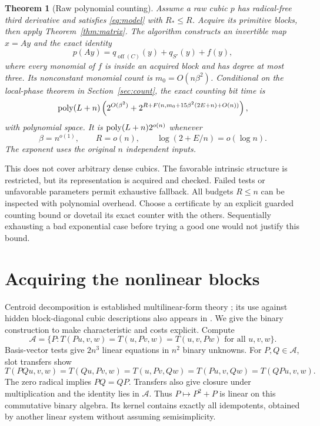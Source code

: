\documentclass[11pt,a4paper]{article}
\newtheorem{theorem}{Theorem}[section]
\newcommand{\off}{\operatorname{off}}\newcommand{\diag}{\operatorname{diag}}
\begin{document}
\begin{theorem}[Raw polynomial counting]\label{thm:raw}
Assume a raw cubic $p$ has radical-free third derivative and satisfies
\eqref{eq:model} with $R_*\le R$.
Acquire its primitive blocks, then apply Theorem~\ref{thm:matrix}.
The algorithm constructs an invertible map $x=Ay$ and the exact identity
\begin{equation}\label{eq:identity}
p(Ay)=q_{\off(C)}(y)+q_{S'}(y)+f(y),
\end{equation}
where every monomial of $f$ is inside an acquired block and has degree
at most three. Its nonconstant monomial count is $m_0=O(n\beta^2)$.
Conditional on the local-phase theorem in Section~\ref{sec:count},
the exact counting bit time is
\begin{equation}\label{eq:total}
\operatorname{poly}(L+n)\left(2^{O(\beta^2)}
+2^{R+F(n,m_0+15\beta^2(2E+n)+O(n))}\right),
\end{equation}
with polynomial space. It is $\operatorname{poly}(L+n)2^{o(n)}$ whenever
\begin{equation}\label{eq:regime}
\beta=n^{o(1)},\qquad R=o(n),\qquad
\log(2+E/n)=o(\log n).
\end{equation}
The exponent uses the original $n$ independent inputs.
\end{theorem}

This does not cover arbitrary dense cubics. The favorable intrinsic
structure is restricted, but its representation is acquired and checked.
Failed tests or unfavorable parameters permit exhaustive fallback.
All budgets $R\le n$ can be inspected with polynomial overhead.
Choose a certificate by an explicit guarded counting bound or dovetail
its exact counter with the others. Sequentially exhausting a bad
exponential case before trying a good one would not justify this bound.

\section{Acquiring the nonlinear blocks}
\label{sec:centroid}
Centroid decomposition is established multilinear-form theory
\cite{huang}; its use against hidden block-diagonal cubic descriptions
also appears in \cite[Appendix A]{blaser}. We give the binary
construction to make characteristic and costs explicit.
Compute
\[
\mathcal A=\{P:T(Pu,v,w)=T(u,Pv,w)=T(u,v,Pw)
\text{ for all }u,v,w\}.
\]
Basis-vector tests give $2n^3$ linear equations in $n^2$ binary
unknowns. For $P,Q\in\mathcal A$, slot transfers show
\[
T(PQu,v,w)=T(Qu,Pv,w)=T(u,Pv,Qw)
=T(Pu,v,Qw)=T(QPu,v,w).
\]
The zero radical implies $PQ=QP$. Transfers also give closure
under multiplication and the identity lies in $\mathcal A$.
Thus $P\mapsto P^2+P$ is linear on this commutative binary algebra.
Its kernel contains exactly all idempotents, obtained by another
linear system without assuming semisimplicity.
\end{document}

